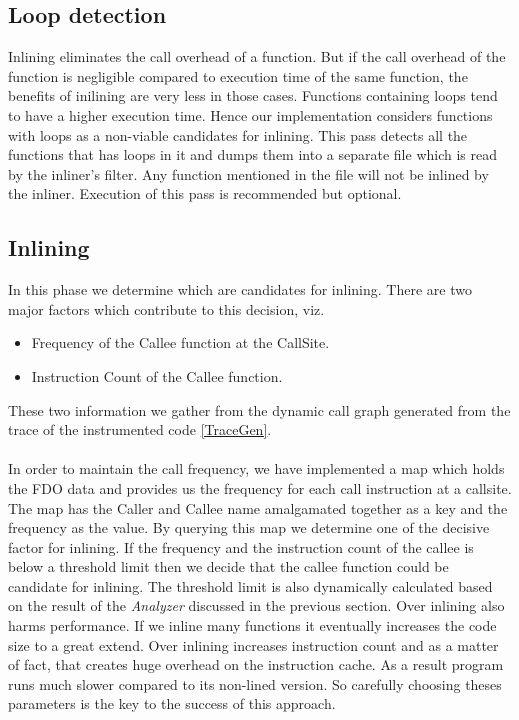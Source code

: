 \documentclass{sigplanconf}
\begin{document}
	\subsection{Loop detection}
	 Inlining eliminates the call overhead of a function. But if the call overhead of the function is negligible compared to execution time of the same function, the benefits of inilining are very less in those cases. Functions containing loops tend to have a higher execution time. Hence our implementation considers functions with loops as a non-viable candidates for inlining. This pass detects all the functions that has loops in it and dumps them into a separate file which is read by the inliner's filter. Any function mentioned in the file will not be inlined by the inliner. Execution of this pass is recommended but optional. 	
	\subsection{Inlining}	
    In this phase we determine which are candidates for inlining. There are two major factors which contribute to this decision, viz.
    \begin{itemize}
        \item Frequency of the Callee function at the CallSite.
        \item Instruction Count of the Callee function.
    \end{itemize}
    These two information we gather from the dynamic call graph generated from the trace of the instrumented code \ref{TraceGen}.

    \paragraph{} In order to maintain the call frequency, we have implemented a map which holds the FDO data and provides us the frequency for each call instruction at a callsite. The map has the Caller and Callee name amalgamated together as a key and the frequency as the value. By querying this map we determine one of the decisive factor for inlining. If the frequency and the instruction count of the callee is below a threshold limit then we decide that the callee function could be candidate for inlining. The threshold limit is also dynamically calculated based on the result of the \textit{Analyzer} discussed in the previous section. Over inlining also harms performance. If we inline many functions it eventually increases the code size to a great extend. Over inlining increases instruction count and as a matter of fact, that creates huge overhead on the instruction cache. As a result program runs much slower compared to its non-lined version. So carefully choosing theses parameters is the key to the success of this approach.
\end{document}
